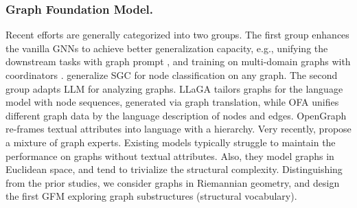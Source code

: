   \vspace{-0.05in}
\subsubsection*{\textbf{Graph Foundation Model.}}


Recent efforts are generally categorized into two groups.
The first group enhances the vanilla GNNs to achieve better generalization capacity, e.g., unifying the downstream tasks with graph prompt \cite{kdd23all-in-one}, and training on multi-domain graphs with coordinators \cite{kdd24gcope}.
\citet{zhao2024graphany} generalize SGC \cite{icml19sgc} for node classification on any graph.
The second group adapts LLM for analyzing graphs.
LLaGA \cite{icml24llaga} tailors graphs for the language model with node sequences, generated via graph translation,
while OFA \cite{iclr24ofa}  unifies different graph data by the language description of nodes and edges.
OpenGraph \cite{xia2024opengraph} re-frames textual attributes into language with a hierarchy.
Very recently, \citet{xia2024anygraph} propose a mixture of graph experts.
Existing models  typically struggle to maintain the performance on graphs without textual attributes.
Also, they model graphs in Euclidean space, and tend to trivialize the structural complexity.
Distinguishing from the prior studies, we consider graphs in Riemannian geometry, and design the first GFM exploring graph substructures (structural vocabulary).

